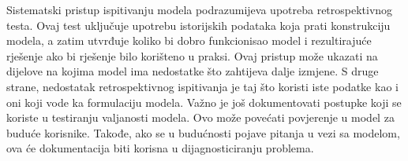 \documentclass[a4paper, utf8, 11pt, colorlinks]{article}
\begin{document}
  Sistematski pristup ispitivanju modela podrazumijeva upotreba retrospektivnog testa. Ovaj test uključuje upotrebu istorijskih podataka koja prati konstrukciju modela, a zatim utvrđuje koliko bi dobro funkcionisao model i rezultirajuće rješenje 
ako bi rješenje bilo korišteno u praksi.  Ovaj pristup može ukazati na dijelove na kojima model ima nedostatke što zahtijeva dalje izmjene. 
S druge strane, nedostatak retrospektivnog ispitivanja je taj što koristi iste podatke kao i oni koji vode ka formulaciju modela. %
  Važno je još dokumentovati postupke koji se koriste u testiranju valjanosti modela. Ovo može  povećati povjerenje u model za buduće korisnike. Takođe, ako se u budućnosti pojave pitanja u vezi sa modelom, ova će dokumentacija biti korisna u dijagnosticiranju problema. 

\end{document}

